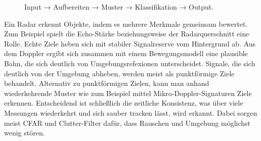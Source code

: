 \usetikzlibrary{arrows.meta,positioning}

\begin{figure}[h]
\centering
{}
\caption{Input → Aufbereiten → Muster → Klassifikation → Output.}
\label{fig:radar-meta-simple}
\end{figure}


Ein Radar erkennt Objekte, indem es mehrere Merkmale gemeinsam bewertet. 
Zum Beispiel spielt die Echo-Stärke beziehungsweise der Radarquerschnitt eine Rolle. 
Echte Ziele heben sich mit stabiler Signalreserve vom Hintergrund ab. Aus dem Doppler 
ergibt sich zusammen mit einem Bewegungsmodell eine plausible Bahn, die sich 
deutlich von Umgebungsrefexionen unterscheidet. 
Signale, die sich deutlich von der Umgebung abheben, werden meist als punktförmige Ziele behandelt.
Alternativ zu punktförmigen Zielen, kann man anhand wiederkehrende Muster wie zum 
Beispiel mittel Mikro-Doppler-Signaturen Ziele erkennen.
Entscheidend ist schließlich die zeitliche Konsistenz, was über viele Messungen wiederkehrt und sich sauber tracken lässt, 
wird erkannt. Dabei sorgen meist CFAR und Clutter-Filter dafür, dass Rauschen und Umgebung möglichst wenig stören.








